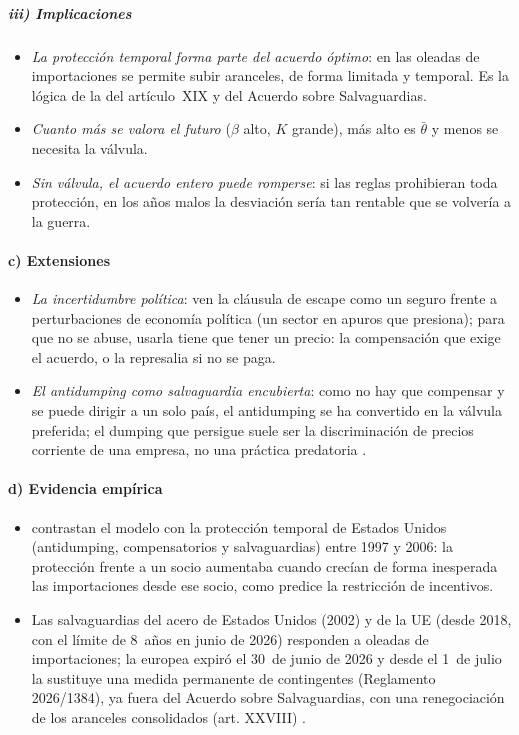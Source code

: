 \documentclass[11pt]{article}
\begin{document}
\subparagraph{iii) Implicaciones}

\begin{itemize}
\item \emph{La protección temporal forma parte del acuerdo óptimo}: en las oleadas de importaciones se permite subir aranceles, de forma limitada y temporal. Es la lógica de la  del artículo~XIX y del Acuerdo sobre Salvaguardias.
\item \emph{Cuanto más se valora el futuro} ($\beta$ alto, $K$ grande), más alto es $\bar\theta$ y menos se necesita la válvula.
\item \emph{Sin válvula, el acuerdo entero puede romperse}: si las reglas prohibieran toda protección, en los años malos la desviación sería tan rentable que se volvería a la guerra.
\end{itemize}

\paragraph{c) Extensiones}

\begin{itemize}
\item \emph{La incertidumbre política}: \textcite{RosendorffMilner2001} ven la cláusula de escape como un seguro frente a perturbaciones de economía política (un sector en apuros que presiona); para que no se abuse, usarla tiene que tener un precio: la compensación que exige el acuerdo, o la represalia si no se paga.
\item \emph{El antidumping como salvaguardia encubierta}: como no hay que compensar y se puede dirigir a un solo país, el antidumping se ha convertido en la válvula preferida; el dumping que persigue suele ser la discriminación de precios corriente de una empresa, no una práctica predatoria .
\end{itemize}

\paragraph{d) Evidencia empírica}

\begin{itemize}
\item \textcite{BownCrowley2013} contrastan el modelo con la protección temporal de Estados Unidos (antidumping, compensatorios y salvaguardias) entre 1997 y 2006: la protección frente a un socio aumentaba cuando crecían de forma inesperada las importaciones desde ese socio, como predice la restricción de incentivos.
\item Las salvaguardias del acero de Estados Unidos (2002) y de la UE (desde 2018, con el límite de 8~años en junio de 2026) responden a oleadas de importaciones; la europea expiró el 30~de junio de 2026 y desde el 1~de julio la sustituye una medida permanente de contingentes (Reglamento 2026/1384), ya fuera del Acuerdo sobre Salvaguardias, con una renegociación de los aranceles consolidados (art. XXVIII) .
\end{itemize}
\end{document}
